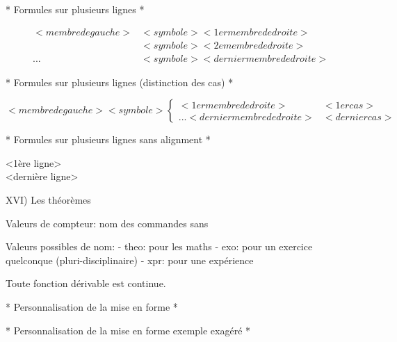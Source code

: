 * Formules sur plusieurs lignes *

\begin{align} 
	<membre de gauche>
	& <symbole> <1er membre de droite> \\
	& <symbole> <2e membre de droite> \\
	...
	& <symbole> <dernier membre de droite>
\end{align}

* Formules sur plusieurs lignes (distinction des cas) *

\[
<membre de gauche> <symbole>
\begin{cases}
	<1er membre de droite> & <1er cas> \\
	...
	<dernier membre de droite> & <dernier cas>
\end{cases}
\]

* Formules sur plusieurs lignes sans alignment *

\usepackage{mathtools}
\usepackage{amssymb}

\begin{multiline} %
	<1ère ligne> \\
	<dernière ligne>
\end{multiline}

XVI) Les théorèmes

\newtheorem{<nom>}{<titre>}[<compteur>]

Valeurs de compteur: nom des commandes sans \

Valeurs possibles de nom:
	- theo: pour les maths
	- exo: pour un exercice quelconque (pluri-disciplinaire)
	- xpr: pour une expérience	

\begin{theo}[de Zorn] %
	Toute fonction dérivable est continue.
\end{theo}


* Personnalisation de la mise en forme *

\usepackage{xcolor}
\usepackage{ntheorem} %
\theoremstyle{plain} %
\theorembodyfont{\normalfont} %

\newtheorem{exo}{Exercice} %
\theoremheaderfont{\color{blue}}
\newtheorem{defi}{Définition} %

* Personnalisation de la mise en forme exemple exagéré *

